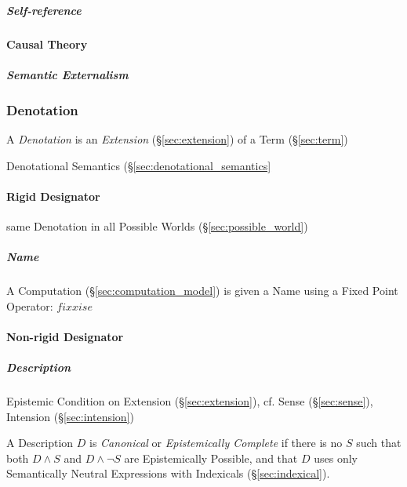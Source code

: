 \subparagraph{Self-reference}\label{sec:self_reference}\hfill



\paragraph{Causal Theory}\label{sec:causal_reference}\hfill

\subparagraph{Semantic Externalism}\label{sec:semantic_externalism}\hfill



\subsubsection{Denotation}\label{sec:denotation}

A \emph{Denotation} is an \emph{Extension} (\S\ref{sec:extension}) of
a Term (\S\ref{sec:term})

Denotational Semantics (\S\ref{sec:denotational_semantics}



\paragraph{Rigid Designator}\label{sec:rigid_designator}\hfill

same Denotation in all Possible Worlds (\S\ref{sec:possible_world})

\subparagraph{Name}\label{sec:name}\hfill

A Computation (\S\ref{sec:computation_model}) is given a Name using a
Fixed Point Operator: $fix x is e$



\paragraph{Non-rigid Designator}\label{sec:nonrigid_designator}\hfill

\subparagraph{Description}\label{sec:description}\hfill
\cite{chalmers02}

Epistemic Condition on Extension (\S\ref{sec:extension}), cf. Sense
(\S\ref{sec:sense}), Intension (\S\ref{sec:intension})

A Description $D$ is \emph{Canonical} or \emph{Epistemically Complete}
if there is no $S$ such that both $D \wedge S$ and $D \wedge \neg S$
are Epistemically Possible, and that $D$ uses only Semantically
Neutral Expressions with Indexicals (\S\ref{sec:indexical}).

